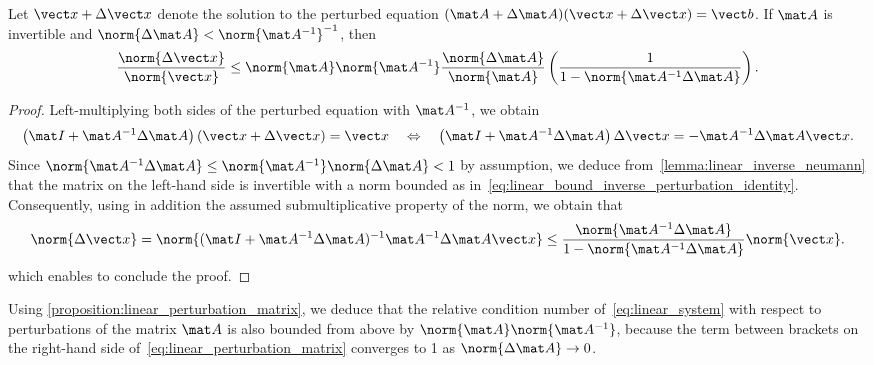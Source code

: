 \begin{proposition}
    \label{proposition:linear_perturbation_matrix}
    Let $\vect x + \Delta \vect x$ denote the solution to the perturbed equation $(\mat A + \Delta \mat A) (\vect x + \Delta \vect x) = \vect b$.
    If $\mat A$ is invertible and $\norm{\Delta \mat A} < \norm{\mat A^{-1}}^{-1}$,
    then
    \begin{equation}
        \label{eq:linear_perturbation_matrix}
        \frac{\norm{\Delta \vect x}}{\norm{\vect x}}
        \leq \norm{\mat A} \norm{\mat A^{-1}} \frac{\norm{\Delta \mat A}}{\norm{\mat A}}
        \left(\frac{1}{1 - \norm{\mat A^{-1} \Delta \mat A}} \right).
    \end{equation}
\end{proposition}
\begin{proof}
    Left-multiplying both sides of the perturbed equation with $\mat A^{-1}$,
    we obtain
    \begin{equation}
        \label{eq:linear_perturbation_matrix_initial}
        \left(\mat I + \mat A^{-1} \Delta \mat A\right) (\vect x + \Delta \vect x) = \vect x
        \quad \Leftrightarrow \quad
        \left(\mat I + \mat A^{-1} \Delta \mat A\right) \Delta \vect x = - \mat A^{-1} \Delta \mat A \vect x.
    \end{equation}
    Since $\norm{\mat A^{-1} \Delta \mat A} \leq \norm{\mat A^{-1}} \norm{\Delta \mat A} < 1$ by assumption,
    we deduce from~\cref{lemma:linear_inverse_neumann} that the matrix on the left-hand side is invertible
    with a norm bounded as in~\eqref{eq:linear_bound_inverse_perturbation_identity}.
    Consequently,
    using in addition the assumed submultiplicative property of the norm,
    we obtain that
    \[
        \norm{\Delta \vect x}
        = \norm{(\mat I + \mat A^{-1} \Delta \mat A)^{-1} \mat A^{-1} \Delta \mat A \vect x}
        \leq \frac{\norm{\mat A^{-1} \Delta \mat A}}{1 - \norm{\mat A^{-1} \Delta \mat A}} \norm{\vect x}.
    \]
    which enables to conclude the proof.
\end{proof}
Using \cref{proposition:linear_perturbation_matrix},
we deduce that the relative condition number of~\eqref{eq:linear_system} with respect to perturbations of the matrix $\mat A$ is also bounded from above by $\norm{\mat A} \norm{\mat A^{-1}}$,
because the term between brackets on the right-hand side of~\eqref{eq:linear_perturbation_matrix} converges to 1 as $\norm{\Delta \mat A} \to 0$.


